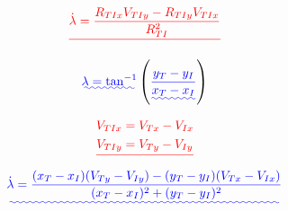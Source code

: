 \documentclass[conference]{IEEEtran}
\providecommand{\DIFadd}[1]{{\protect\color{blue}\uwave{#1}}} %
\providecommand{\DIFdel}[1]{{\protect\color{red}\sout{#1}}}                      %
\providecommand{\DIFaddbegin}{} %
\providecommand{\DIFaddend}{} %
\providecommand{\DIFdelbegin}{} %
\providecommand{\DIFdelend}{} %
\newcommand{\DIFscaledelfig}{0.5}
\newlength{\DIFdelgraphicswidth} %
\newlength{\DIFdelgraphicsheight} %
\newcommand{\DIFaddincludegraphics}[2][]{{\color{blue}\fbox{\DIFOincludegraphics[#1]{#2}}}} %
\newcommand{\DIFdelincludegraphics}[2][]{%
\sbox{\DIFdelgraphicsbox}{\DIFOincludegraphics[#1]{#2}}%
\settoboxwidth{\DIFdelgraphicswidth}{\DIFdelgraphicsbox} %
\settoboxtotalheight{\DIFdelgraphicsheight}{\DIFdelgraphicsbox} %
\scalebox{\DIFscaledelfig}{%
\parbox[b]{\DIFdelgraphicswidth}{\usebox{\DIFdelgraphicsbox}\\[-\baselineskip] \rule{\DIFdelgraphicswidth}{0em}}\llap{\resizebox{\DIFdelgraphicswidth}{\DIFdelgraphicsheight}{%
\setlength{\unitlength}{\DIFdelgraphicswidth}%
\begin{picture}(1,1)%
\thicklines\linethickness{2pt} %
{\color[rgb]{1,0,0}\put(0,0){\framebox(1,1){}}}%
{\color[rgb]{1,0,0}\put(0,0){\line( 1,1){1}}}%
{\color[rgb]{1,0,0}\put(0,1){\line(1,-1){1}}}%
\end{picture}%
}\hspace*{3pt}}} %
} %
\DeclareRobustCommand{\DIFaddbegin}{\DIFOaddbegin \let\includegraphics\DIFaddincludegraphics} %
\DeclareRobustCommand{\DIFaddend}{\DIFOaddend \let\includegraphics\DIFOincludegraphics} %
\DeclareRobustCommand{\DIFdelbegin}{\DIFOdelbegin \let\includegraphics\DIFdelincludegraphics} %
\DeclareRobustCommand{\DIFdelend}{\DIFOaddend \let\includegraphics\DIFOincludegraphics} %
\begin{document}
 




\DIFdelbegin \begin{displaymath} \DIFdel{%
\dot{\lambda} = \frac{R_{TIx}V_{TIy}-R_{TIy}V_{TIx}}{R_{TI}^2}
}\end{displaymath}
\DIFdelend %


\begin{equation} \DIFdelbegin %
\DIFdelend \DIFaddbegin \label{eq:LOS}
\DIFadd{\lambda = \tan^{-1} }\left(\DIFadd{\frac{y_T - y_I}{x_T - x_I}}\right)
\DIFaddend \end{equation} 

\DIFdelbegin \begin{align*}
\DIFdel{%
\begin{split}
V_{TIx} &= V_{Tx}-V_{Ix}
\\
V_{TIy} &= V_{Ty}-V_{Iy}
\\
\end{split}
}\end{align*}
\DIFdelend \DIFaddbegin \begin{equation} \DIFadd{\label{eq:losrate}
\dot{\lambda} = \frac{(x_T - x_I)(V_{Ty}-V_{Iy}) - (y_T - y_I)(V_{Tx}-V_{Ix})}{(x_T - x_I)^2+(y_T - y_I)^2}
}\end{equation}
\DIFaddend 



\DIFaddbegin 
\end{document}
